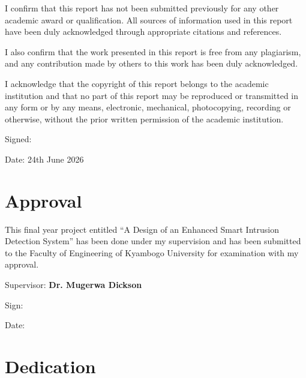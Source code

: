 \documentclass[12pt,a4paper,oneside]{report}
\begin{document}
I confirm that this report has not been submitted previously for any other academic award or qualification. All sources of information used in this report have been duly acknowledged through appropriate citations and references.

I also confirm that the work presented in this report is free from any plagiarism, and any contribution made by others to this work has been duly acknowledged.

I acknowledge that the copyright of this report belongs to the academic institution and that no part of this report may be reproduced or transmitted in any form or by any means, electronic, mechanical, photocopying, recording or otherwise, without the prior written permission of the academic institution.

\vspace{2cm}
\noindent Signed: \underline{\hspace{5cm}}

\vspace{1cm}
\noindent Date: 24th June 2026

\clearpage
\chapter*{Approval}

This final year project entitled ``A Design of an Enhanced Smart Intrusion Detection System'' has been done under my supervision and has been submitted to the Faculty of Engineering of Kyambogo University for examination with my approval.

\vspace{1.5cm}
\noindent Supervisor: \textbf{Dr. Mugerwa Dickson}

\vspace{1.5cm}
\noindent Sign: \underline{\hspace{5cm}}

\vspace{1cm}
\noindent Date: \underline{\hspace{5cm}}

\clearpage
\chapter*{Dedication}
\end{document}
